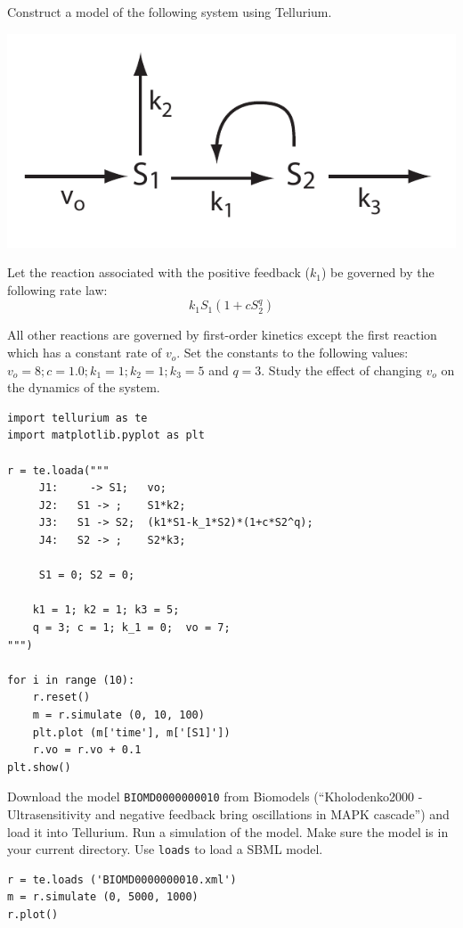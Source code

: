 \documentclass[12pt]{article}
\begin{document}
\begin{question}
Construct a model of the following system using Tellurium.

{\centering
\includegraphics[scale = 0.6]{Heinrich77Model}}

Let the reaction associated with the positive feedback ($k_1$) be governed by the following rate law:
%
$$ k_1 S_1 (1 + c S^q_2) $$

All other reactions are governed by first-order kinetics except the first reaction which has a constant rate of $v_o$. Set the constants to the following values: $v_o = 8; c = 1.0; k_1 = 1; k_2 = 1; k_3 = 5$ and $q = 3$. Study the effect of changing $v_o$ on the dynamics of the system.
\end{question}
\cprotEnv\begin{solution}
\begin{verbatim}
import tellurium as te
import matplotlib.pyplot as plt

r = te.loada("""
     J1:     -> S1;   vo;
     J2:   S1 -> ;    S1*k2;
     J3:   S1 -> S2;  (k1*S1-k_1*S2)*(1+c*S2^q);
     J4:   S2 -> ;    S2*k3;

     S1 = 0; S2 = 0;

    k1 = 1; k2 = 1; k3 = 5;
    q = 3; c = 1; k_1 = 0;  vo = 7;
""")

for i in range (10):
    r.reset()
    m = r.simulate (0, 10, 100)
    plt.plot (m['time'], m['[S1]'])
    r.vo = r.vo + 0.1
plt.show()
\end{verbatim}
\end{solution}


\begin{question}
 Download the model {\tt BIOMD0000000010} from Biomodels (``Kholodenko2000 - Ultrasensitivity and negative feedback bring oscillations in MAPK cascade'') and load it into Tellurium. Run a simulation of the model. Make sure the model is in your current directory. Use {\tt loads} to load a SBML model.
\end{question}
\cprotEnv\begin{solution}
\begin{verbatim}
r = te.loads ('BIOMD0000000010.xml')
m = r.simulate (0, 5000, 1000)
r.plot()
\end{verbatim}
\end{solution}
\end{document}
